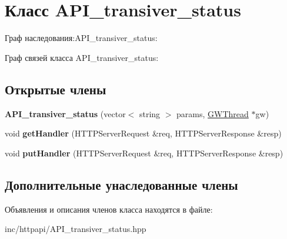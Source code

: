 \hypertarget{classAPI__transiver__status}{}\section{Класс A\+P\+I\+\_\+transiver\+\_\+status}
\label{classAPI__transiver__status}


Граф наследования\+:A\+P\+I\+\_\+transiver\+\_\+status\+:


Граф связей класса A\+P\+I\+\_\+transiver\+\_\+status\+:
\subsection*{Открытые члены}
\begin{DoxyCompactItemize}
\item 
\mbox{\label{classAPI__transiver__status_ac9d14e285afbe9cdfb9d785f7cdb4aaa}} 
{\bfseries A\+P\+I\+\_\+transiver\+\_\+status} (vector$<$ string $>$ params, \hyperlink{classGWThread}{G\+W\+Thread} $\ast$gw)
\item 
\mbox{\label{classAPI__transiver__status_aca5fa9d1f0857e04571b7ba9c36216d5}} 
void {\bfseries get\+Handler} (H\+T\+T\+P\+Server\+Request \&req, H\+T\+T\+P\+Server\+Response \&resp)
\item 
\mbox{\label{classAPI__transiver__status_a617bc05a397d183de9f323a217e4dd03}} 
void {\bfseries put\+Handler} (H\+T\+T\+P\+Server\+Request \&req, H\+T\+T\+P\+Server\+Response \&resp)
\end{DoxyCompactItemize}
\subsection*{Дополнительные унаследованные члены}


Объявления и описания членов класса находятся в файле\+:\begin{DoxyCompactItemize}
\item 
inc/httpapi/A\+P\+I\+\_\+transiver\+\_\+status.\+hpp\end{DoxyCompactItemize}
